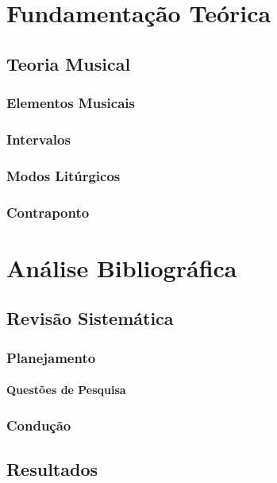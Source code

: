 \chapter[Fundamentação Teórica]{Fundamentação Teórica}

  \section[Teoria Musical]{Teoria Musical}

    \subsection[Elementos Musicais]{Elementos Musicais}
    \subsection[Intervalos]{Intervalos}
    \subsection[Modos Litúrgicos]{Modos Litúrgicos}
    \subsection[Contraponto]{Contraponto}

\chapter[Análise Bibliográfica]{Análise Bibliográfica}

  \section[Revisão Sistemática]{Revisão Sistemática}
    \subsection[Planejamento]{Planejamento}
      \subsubsection[Questões de Pesquisa]{Questões de Pesquisa}

    \subsection[Condução]{Condução}

  \section[Resultados]{Resultados}

